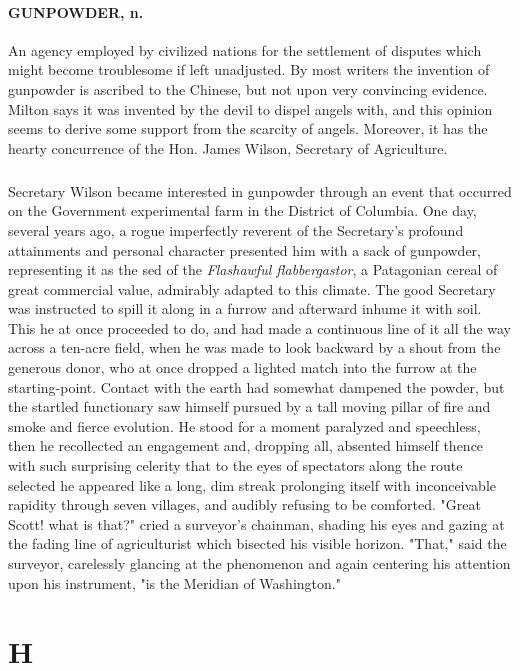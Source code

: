 \documentclass[11pt]{article}
\begin{document}
\paragraph{GUNPOWDER, n.}  An agency employed by civilized nations for the
settlement of disputes which might become troublesome if left
unadjusted.  By most writers the invention of gunpowder is ascribed to
the Chinese, but not upon very convincing evidence.  Milton says it
was invented by the devil to dispel angels with, and this opinion
seems to derive some support from the scarcity of angels.  Moreover,
it has the hearty concurrence of the Hon. James Wilson, Secretary of
Agriculture.
\subparagraph{}   Secretary Wilson became interested in gunpowder through an event
that occurred on the Government experimental farm in the District of 
Columbia.  One day, several years ago, a rogue imperfectly reverent of
the Secretary's profound attainments and personal character presented
him with a sack of gunpowder, representing it as the sed of the
{\em Flashawful flabbergastor}, a Patagonian cereal of great commercial
value, admirably adapted to this climate.  The good Secretary was
instructed to spill it along in a furrow and afterward inhume it with
soil.  This he at once proceeded to do, and had made a continuous line
of it all the way across a ten-acre field, when he was made to look
backward by a shout from the generous donor, who at once dropped a
lighted match into the furrow at the starting-point.  Contact with the
earth had somewhat dampened the powder, but the startled functionary
saw himself pursued by a tall moving pillar of fire and smoke and
fierce evolution.  He stood for a moment paralyzed and speechless,
then he recollected an engagement and, dropping all, absented himself
thence with such surprising celerity that to the eyes of spectators
along the route selected he appeared like a long, dim streak
prolonging itself with inconceivable rapidity through seven villages,
and audibly refusing to be comforted.  "Great Scott! what is that?"
cried a surveyor's chainman, shading his eyes and gazing at the fading
line of agriculturist which bisected his visible horizon.  "That,"
said the surveyor, carelessly glancing at the phenomenon and again
centering his attention upon his instrument, "is the Meridian of
Washington."



\section*{H}
\end{document}
